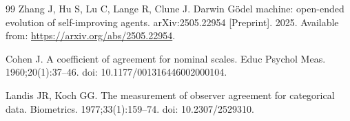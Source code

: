 \documentclass{IOS-Book-Article}
\begin{document}
\begin{thebibliography}{99}
 Zhang J, Hu S, Lu C, Lange R, Clune J. Darwin G\"odel machine: open-ended evolution of self-improving agents. arXiv:2505.22954 [Preprint]. 2025. Available from: \url{https://arxiv.org/abs/2505.22954}.



 Cohen J. A coefficient of agreement for nominal scales. Educ Psychol Meas. 1960;20(1):37--46. doi: 10.1177/001316446002000104.

 Landis JR, Koch GG. The measurement of observer agreement for categorical data. Biometrics. 1977;33(1):159--74. doi: 10.2307/2529310.

\end{thebibliography}
\end{document}

